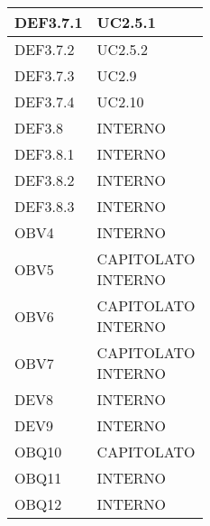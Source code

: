 \documentclass{scalatekids-article}
\begin{document}
\begin{longtable}[H]{|p{5.5cm}|p{5.5cm}|}
  \hline
  DEF3.7.1 & \multiLineCell[t]{UC2.5.1\\}\\
  \hline
  DEF3.7.2 & \multiLineCell[t]{UC2.5.2\\}\\
  \hline
  DEF3.7.3 & \multiLineCell[t]{UC2.9\\}\\
  \hline
  DEF3.7.4 & \multiLineCell[t]{UC2.10\\}\\
  \hline
  DEF3.8 & \multiLineCell[t]{INTERNO\\}\\
  \hline
  DEF3.8.1 & \multiLineCell[t]{INTERNO\\}\\
  \hline
  DEF3.8.2 & \multiLineCell[t]{INTERNO\\}\\
  \hline
  DEF3.8.3 & \multiLineCell[t]{INTERNO\\}\\
  \hline
  OBV4 & \multiLineCell[t]{INTERNO\\}\\
  \hline
  OBV5 & \multiLineCell[t]{CAPITOLATO\\INTERNO\\}\\
  \hline
  OBV6 & \multiLineCell[t]{CAPITOLATO\\INTERNO\\}\\
  \hline
  OBV7 & \multiLineCell[t]{CAPITOLATO\\INTERNO\\}\\
  \hline
  DEV8 & \multiLineCell[t]{INTERNO\\}\\
  \hline
  DEV9 & \multiLineCell[t]{INTERNO\\}\\
  \hline
  OBQ10 & \multiLineCell[t]{CAPITOLATO\\}\\
  \hline
  OBQ11 & \multiLineCell[t]{INTERNO\\}\\
  \hline
  OBQ12 & \multiLineCell[t]{INTERNO\\}\\
  \hline
\end{longtable}
\newpage
\end{document}
